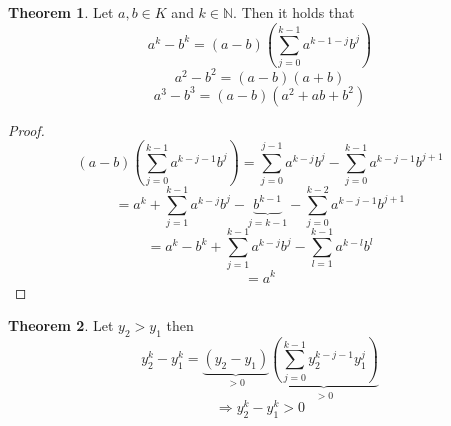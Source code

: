 \documentclass[a4paper,landscape,twocolumn]{article}
\theoremstyle{definition}
\newtheorem{theorem}{Theorem}
\begin{document}
\begin{theorem}
  Let $a, b \in K$ and $k \in \mathbb N$.
  Then it holds that
  \[ a^k - b^k = (a - b)\left(\sum_{j=0}^{k-1} a^{k-1-j} b^j\right) \]
  \[ a^2 - b^2 = (a - b)(a + b) \]
  \[ a^3 - b^3 = (a - b)(a^2 + ab + b^2) \]
\end{theorem}

\begin{proof}
  \[
    (a - b)\left(\sum_{j=0}^{k-1} a^{k-j-1} b^j\right)
    = \sum_{j=0}^{j-1} a^{k-j} b^j - \sum_{j=0}^{k-1} a^{k-j-1} b^{j+1}
  \] \[
    = a^k + \sum_{j=1}^{k-1} a^{k-j} b^j - \underbrace{b^{k-1}}_{j=k-1} - \sum_{j=0}^{k-2} a^{k-j-1} b^{j+1}
  \] \[
    = a^k - b^k + \sum_{j=1}^{k-1} a^{k-j} b^j - \sum_{l=1}^{k-1} a^{k-l} b^l
  \] \[
    = a^k
  \]
\end{proof}

\begin{theorem}
  Let $y_2 > y_1$ then
  \[ y_2^k - y_1^k = \underbrace{(y_2 - y_1)}_{> 0} \underbrace{\left(\sum_{j=0}^{k-1} y_2^{k-j-1} y_1^j\right)}_{> 0} \]
  \[ \Rightarrow y_2^k - y_1^k > 0 \]
\end{theorem}
\end{document}

